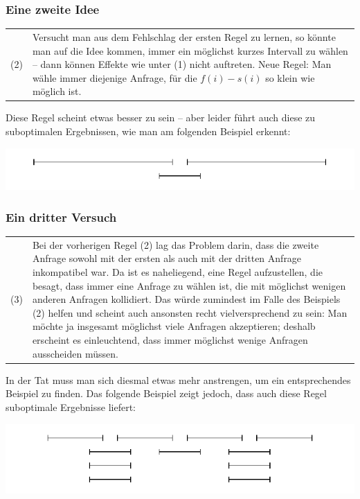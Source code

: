 \documentclass[smaller]{beamer}
\begin{document}
\begin{frame}
 \frametitle{Eine zweite Idee}
 \begin{tabular}{p{0.5cm}p{10cm}} 
 (2) & Versucht man aus dem Fehlschlag der ersten Regel zu lernen, so könnte man auf die Idee kommen, \alert{immer ein möglichst kurzes Intervall} zu wählen -- dann können Effekte wie unter (1) nicht auftreten. Neue Regel: Man wähle immer diejenige Anfrage, für die $f(i)-s(i)$ so klein wie möglich ist.
\end{tabular}
\medskip

Diese Regel scheint etwas besser zu sein -- aber leider führt auch diese zu suboptimalen Ergebnissen, wie man am folgenden Beispiel erkennt:

\begin{center}
\includegraphics{fig71.pdf}
\end{center}

\end{frame}

\begin{frame}
\frametitle{Ein dritter Versuch}
 \begin{tabular}{p{0.5cm}p{10cm}} 
(3) & Bei der vorherigen Regel (2) lag das Problem darin, dass die zweite Anfrage sowohl mit der ersten als auch mit der dritten Anfrage inkompatibel war. Da ist es naheliegend, eine Regel aufzustellen, die besagt, dass \alert{immer eine Anfrage zu wählen ist, die mit möglichst wenigen anderen Anfragen kollidiert}. Das würde zumindest im Falle des Beispiels (2) helfen und scheint auch ansonsten recht vielversprechend zu sein: Man möchte ja insgesamt möglichst viele Anfragen akzeptieren; deshalb erscheint es einleuchtend, dass immer möglichst wenige Anfragen ausscheiden müssen.
\end{tabular}
\medskip

In der Tat muss man sich diesmal etwas mehr anstrengen, um ein entsprechendes Beispiel zu finden. Das folgende Beispiel zeigt jedoch, dass auch diese Regel suboptimale Ergebnisse liefert:

\begin{center}
 \includegraphics{fig72.pdf}
\end{center}
\end{frame}
\end{document}
